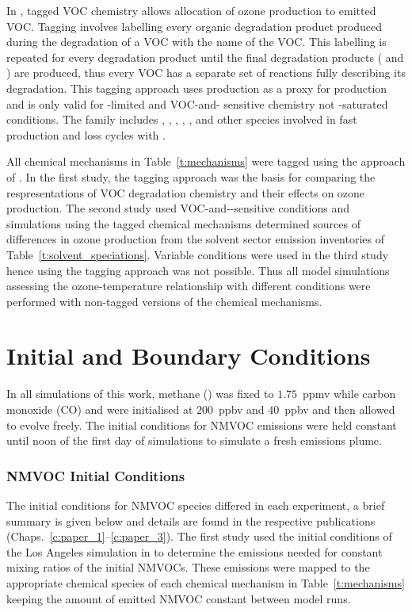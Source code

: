 In \citet{Butler:2011}, tagged VOC chemistry allows allocation of ozone production to emitted VOC.
Tagging involves labelling every organic degradation product produced during the degradation of a VOC with the name of the VOC.
This labelling is repeated for every degradation product until the final degradation products ( and ) are produced, thus every VOC has a separate set of reactions fully describing its degradation.
This tagging approach uses  production as a proxy for  production and is only valid for -limited and VOC-and- sensitive chemistry not -saturated conditions.
The  family includes , , , , ,  and other species involved in fast production and loss cycles with .

All chemical mechanisms in Table~\ref{t:mechanisms} were tagged using the approach of \citet{Butler:2011}.
In the first study, the tagging approach was the basis for comparing the respresentations of VOC degradation chemistry and their effects on ozone production.
The second study used VOC-and--sensitive conditions and simulations using the tagged chemical mechanisms determined sources of differences in ozone production from the solvent sector emission inventories of Table~\ref{t:solvent_speciations}.
Variable  conditions were used in the third study hence using the tagging approach was not possible.
Thus all model simulations assessing the ozone-temperature relationship with different  conditions were performed with non-tagged versions of the chemical mechanisms.

\section{Initial and Boundary Conditions} \label{s:initial_conditions}
In all simulations of this work, methane () was fixed to $1.75$~ppmv while carbon monoxide (CO) and  were initialised at $200$~ppbv and $40$~ppbv and then allowed to evolve freely.
The initial conditions for NMVOC emissions were held constant until noon of the first day of simulations to simulate a fresh emissions plume.

\subsubsection{NMVOC Initial Conditions} 
The initial conditions for NMVOC species differed in each experiment, a brief summary is given below and details are found in the respective publications (Chaps.~\ref{c:paper_1}--\ref{c:paper_3}).
The first study used the initial conditions of the Los Angeles simulation in \citet{Butler:2011} to determine the emissions needed for constant mixing ratios of the initial NMVOCs.
These emissions were mapped to the appropriate chemical species of each chemical mechanism in Table~\ref{t:mechanisms} keeping the amount of emitted NMVOC constant between model runs.

